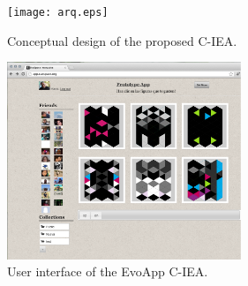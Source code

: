\documentclass{llncs}
\begin{document}
\begin{figure}[t]
    \centering
        \texttt{[image: arq.eps]}
    \caption{Conceptual design of the proposed C-IEA.}
    \label{fig:CIE}
\end{figure}


\begin{figure}[t]
    \centering
        \includegraphics[width=7cm]{EvoApp.eps}
    \caption{User interface of the EvoApp C-IEA.}
    \label{fig:web}
\end{figure}
\end{document}
